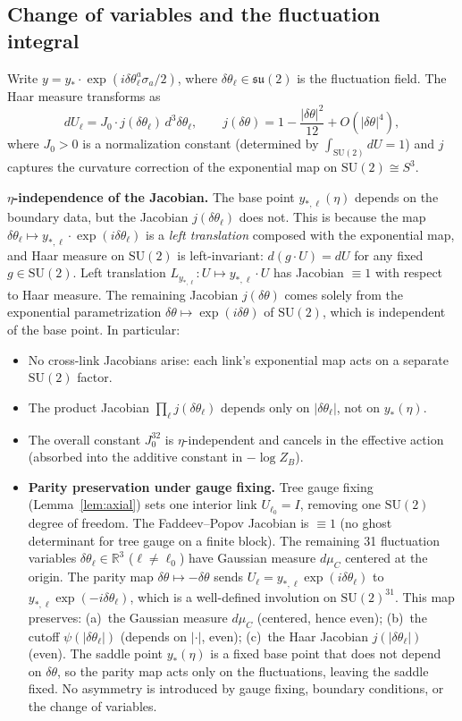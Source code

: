 \documentclass[11pt]{article}
\theoremstyle{definition}
\newcommand{\SU}{\mathrm{SU}}
\newcommand{\su}{\mathfrak{su}}
\newcommand{\R}{\mathbb{R}}
\begin{document}
\subsection{Change of variables and the fluctuation integral}
\label{subsec:fluctuation}

Write $y=y_*\cdot\exp(i\delta\theta^a_\ell\sigma_a/2)$, where
$\delta\theta_\ell\in\su(2)$ is the fluctuation field.  The Haar
measure transforms as
\begin{equation}
dU_\ell=J_0\cdot j(\delta\theta_\ell)\,d^3\delta\theta_\ell,
\qquad j(\delta\theta)=1-\frac{|\delta\theta|^2}{12}+O(|\delta\theta|^4),
\end{equation}
where $J_0>0$ is a normalization constant (determined by
$\int_{\SU(2)}dU=1$) and $j$ captures the curvature correction of
the exponential map on $\SU(2)\cong S^3$.

\textbf{$\eta$-independence of the Jacobian.}
The base point $y_{*,\ell}(\eta)$ depends on the boundary data,
but the Jacobian $j(\delta\theta_\ell)$ does not.
This is because the map $\delta\theta_\ell\mapsto
y_{*,\ell}\cdot\exp(i\delta\theta_\ell)$ is a \emph{left
translation} composed with the exponential map, and Haar measure
on $\SU(2)$ is left-invariant:
$d(g\cdot U)=dU$ for any fixed $g\in\SU(2)$.
Left translation $L_{y_{*,\ell}}:U\mapsto y_{*,\ell}\cdot U$
has Jacobian $\equiv 1$ with respect to Haar measure.
The remaining Jacobian $j(\delta\theta)$ comes solely from
the exponential parametrization $\delta\theta\mapsto
\exp(i\delta\theta)$ of $\SU(2)$, which is independent of the
base point.  In particular:
\begin{itemize}[nosep]
\item No cross-link Jacobians arise: each link's exponential
map acts on a separate $\SU(2)$ factor.
\item The product Jacobian $\prod_\ell j(\delta\theta_\ell)$
depends only on $|\delta\theta_\ell|$, not on $y_*(\eta)$.
\item The overall constant $J_0^{32}$
is $\eta$-independent and cancels in the effective action (absorbed
into the additive constant in $-\log Z_B$).
\item \textbf{Parity preservation under gauge fixing.}
Tree gauge fixing (Lemma~\ref{lem:axial}) sets one interior link
$U_{\ell_0}=I$, removing one $\SU(2)$ degree of freedom.
The Faddeev--Popov Jacobian is $\equiv 1$ (no ghost determinant
for tree gauge on a finite block).
The remaining 31 fluctuation variables
$\delta\theta_\ell\in\R^3$ ($\ell\ne\ell_0$) have
Gaussian measure $d\mu_C$ centered at the origin.
The parity map $\delta\theta\mapsto-\delta\theta$ sends
$U_\ell=y_{*,\ell}\exp(i\delta\theta_\ell)$ to
$y_{*,\ell}\exp(-i\delta\theta_\ell)$, which is a
well-defined involution on $\SU(2)^{31}$.
This map preserves: (a)~the Gaussian measure $d\mu_C$
(centered, hence even); (b)~the cutoff
$\psi(|\delta\theta_\ell|)$ (depends on $|\cdot|$, even);
(c)~the Haar Jacobian $j(|\delta\theta_\ell|)$ (even).
The saddle point $y_*(\eta)$ is a fixed base point that
does not depend on $\delta\theta$, so the parity map
acts only on the fluctuations, leaving the saddle fixed.
No asymmetry is introduced by gauge fixing, boundary
conditions, or the change of variables.
\end{itemize}
\end{document}
